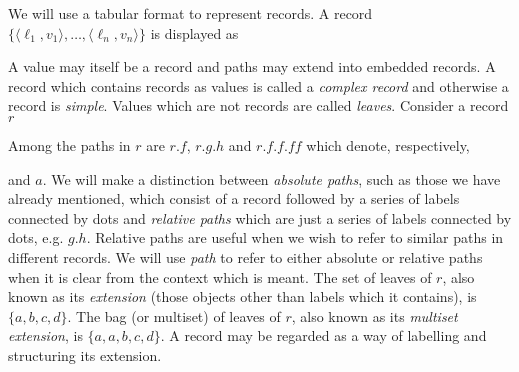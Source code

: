 We will use a tabular format to
represent records.  A record 
$\{\langle\ell_1,v_1\rangle,\ldots,\langle\ell_n,v_n\rangle\}$ is displayed as
\begin{display}
\end{display}

A value may itself be a record and paths may extend into embedded
records.  A record which contains records as values is called a {\it
  complex record\/} and otherwise a record is {\it simple\/}.  Values which are not records are called {\it
  leaves\/}.  Consider a record $r$ \label{pg:record}
\begin{display}
\end{display}
Among the paths in $r$ are $r.f$, $r.g.h$ and $r.f.f.\mathit{ff}$ which denote,
respectively, 
\begin{display}
\end{display}
\begin{display} 
\end{display}
and $a$.  We will make a distinction between \textit{absolute paths},
such as those we have already mentioned, which consist of a record
followed by a series of labels connected by dots and \textit{relative
  paths} which are just a series of labels connected by dots,
e.g. $g.h$.  Relative paths are useful when we wish to refer to
similar paths in different records.  We will use \textit{path} to
refer to either absolute or relative paths when it is clear from the
context which is meant.  The set of leaves of $r$, also known as its {\it
  extension\/} (those objects other than labels which it contains), is
$\{a,b,c,d\}$.  The bag (or multiset) of leaves of $r$, also known as
its {\it multiset extension\/}, is $\{a,a,b,c,d\}$.  A record may be
regarded as a way of labelling and structuring its extension.


